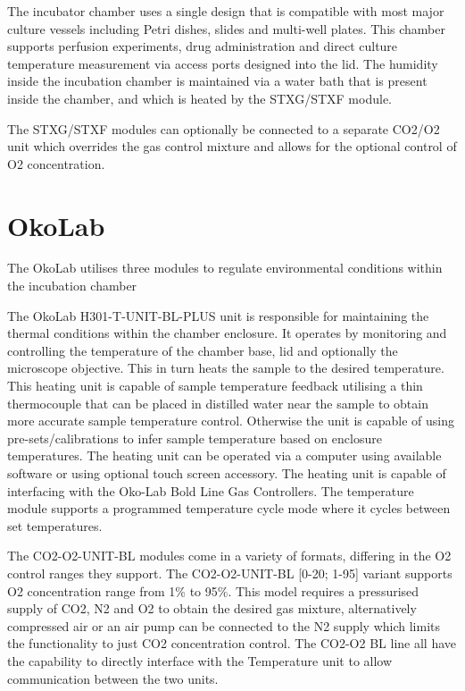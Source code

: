 \documentclass[class=report,11pt,crop=false]{standalone}
\begin{document}
	The incubator chamber uses a single design that is compatible with most major culture vessels including Petri dishes, slides and multi-well plates. This chamber supports perfusion experiments, drug administration and direct culture temperature measurement via access ports designed into the lid. The humidity inside the incubation chamber is maintained via a water bath that is present inside the chamber, and which is heated by the STXG/STXF module.
	
	The STXG/STXF modules can optionally be connected to a separate CO2/O2 unit which overrides the gas control mixture and allows for the optional control of O2 concentration.

	\section{OkoLab}
	The OkoLab utilises three modules to regulate environmental conditions within the incubation chamber
	
	The OkoLab H301-T-UNIT-BL-PLUS\cite{oko-labH301TUNITBLPLUS_Manual} unit is responsible for maintaining the thermal conditions within the chamber enclosure. It operates by monitoring and controlling the temperature of the chamber base, lid and optionally the microscope objective. This in turn heats the sample to the desired temperature. This heating unit is capable of sample temperature feedback utilising a thin thermocouple that can be placed in distilled water near the sample to obtain more accurate sample temperature control. Otherwise the unit is capable of using pre-sets/calibrations to infer sample temperature based on enclosure temperatures. The heating unit can be operated via a computer using available software or using optional touch screen accessory. The heating unit is capable of interfacing with the Oko-Lab Bold Line Gas Controllers. The temperature module supports a programmed temperature cycle mode where it cycles between set temperatures.
	
	
	The CO2-O2-UNIT-BL\cite{oko-labCO2O2UNITBL020_195_Manual} modules come in a variety of formats, differing in the O2 control ranges they support. The CO2-O2-UNIT-BL [0-20; 1-95] variant supports O2 concentration range from 1\% to 95\%. This model requires a pressurised supply of CO2, N2 and O2 to obtain the desired gas mixture, alternatively compressed air or an air pump can be connected to the N2 supply which limits the functionality to just CO2 concentration control. The CO2-O2 BL line all have the capability to directly interface with the Temperature unit to allow communication between the two units.
	
\end{document}
